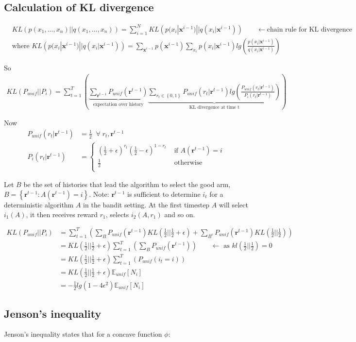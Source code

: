 \documentclass{article}
\newcommand{\E}{\mathbb E}
\newcommand{\set}[1]{\left\{#1\right\}}
\newcommand{\eqn}[1]{\begin{align}#1\end{align}}
\renewcommand{\Pi}[1]{P_i\left( #1 \right)}
\newcommand{\Pu}[1]{P_{unif}\left( #1 \right)}
\newcommand{\Eu}[1]{\E_{unif}\left[ #1 \right]}
\renewcommand{\r}{\boldsymbol{r}}
\renewcommand{\log}[1]{lg\left( #1 \right)}
\newcommand{\kl}[2]{KL\left(#1 || #2 \right)}
\theoremstyle{plain}
\theoremstyle{definition}
\begin{document}
\subsection{Calculation of KL divergence}
\label{sec:calculation_of_divergence}
\eqn{
& \kl{p(x_1,...,x_n)}{q(x_1,...,x_n)} =  \sum_{i=1}^N \kl{p(x_i|\boldsymbol{x}^{i-1})}{q(x_i|\boldsymbol{x}^{i-1})} \qquad \leftarrow \text{chain rule for KL divergence} \\
& \text{where } \kl{p(x_i|\boldsymbol{x}^{i-1})}{q(x_i|\boldsymbol{x}^{i-1})} = 
\sum_{\boldsymbol{x}^{i-1}}p(\boldsymbol{x}^{i-1})\sum_{x_i}p(x_i|\boldsymbol{x}^{i-1})\log{\frac{p(x_i|\boldsymbol{x}^{i-1})}{q(x_i|\boldsymbol{x}^{i-1})}}
}

So 
\eqn {
\kl{P_{unif}}{P_i} = \sum_{t=1}^T\left(
\underbrace{\sum_{\r^{t-1}}\Pu{\r^{t-1}}}_{\text{expectation over history}}
\underbrace{\sum_{r_t \in \set{0,1}}\Pu{r_t|\r^{t-1}}\log{\frac{\Pu{r_t|\r^{t-1}}}{\Pi{r_t|\r^{t-1}}}}}_{\text{KL divergence at time t}}
\right)
}

Now 
\eqn{
\Pu{r_t|\r^{t-1}}& = \frac{1}{2} \;\; \forall \;{r_t,\r^{t-1}} \\
\Pi{r_t|\r^{t-1}}&=
\begin{cases}
(\frac{1}{2}+\epsilon)^{r_t}(\frac{1}{2}-\epsilon)^{1-r_t} & \text{ if } A(\r^{t-1}) = i\\
\frac{1}{2} & \text{ otherwise}\\
\end{cases}
}

Let $B$ be the set of histories that lead the algorithm to select the good arm, $B =\set{ \r^{t-1}:A(\r^{t-1})=i}$. Note: $\r^{t-1}$ is sufficient to determine $i_t$ for a deterministic algorithm $A$ in the bandit setting. At the first timestep $A$ will select $i_1(A)$, it then receives reward $r_1$, selects $i_2(A,r_1)$ and so on.

\eqn {
\kl{P_{unif}}{P_i} &= \sum_{t=1}^T\left(
\sum_{B}\Pu{\r^{t-1}}
\kl{\frac{1}{2}}{\frac{1}{2}+\epsilon}
+ \sum_{B^c}\Pu{\r^{t-1}}
\kl{\frac{1}{2}}{\frac{1}{2}}
\right)\\
&= \kl{\frac{1}{2}}{\frac{1}{2}+\epsilon}\sum_{t=1}^T\left(
\sum_{B}\Pu{\r^{t-1}}
\right) \qquad \leftarrow \text{ as $kl(\frac{1}{2}||\frac{1}{2}) = 0$}\\
&=\kl{\frac{1}{2}}{\frac{1}{2}+\epsilon} \sum_{t=1}^T\left(
\Pu{i_t=i}
\right)\\
&=\kl{\frac{1}{2}}{\frac{1}{2}+\epsilon}\Eu{N_i}\\
&=-\frac{1}{2}\log{1-4\epsilon^2}\Eu{N_i}
}
\pagebreak
\subsection{Jenson's inequality}
Jenson's inequality states that for a concave function $\phi$:
\end{document}
